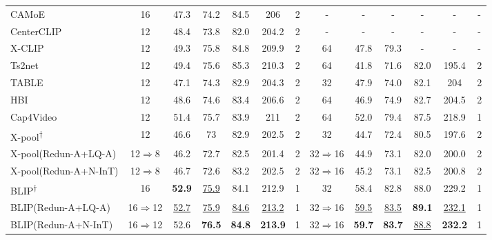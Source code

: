 \documentclass[11pt]{article}
\begin{document}
\begin{table*}[htbp]
\begin{center}
{\begin{tabular}{l|cccccc|cccccc}
CAMoE \cite{cheng2021improving}    & 16  & 47.3  & 74.2  & 84.5  & 206    & 2    & -        & -     & -     & -     & -      & -   \\
CenterCLIP \cite{zhao2022centerclip}   & 12  & 48.4  & 73.8  & 82.0  & 204.2  & 2    & -        & -     & -     & -     & -      & -   \\
X-CLIP \cite{ma2022x}     & 12      & 49.3  & 75.8  & 84.8  & 209.9  & 2    & 64       & 47.8  & 79.3  & -     & -      & -   \\
Ts2net \cite{liu2022ts2}     & 12   & 49.4  & 75.6  & 85.3  & 210.3  & 2    & 64       & 41.8  & 71.6  & 82.0  & 195.4  & 2   \\
TABLE \cite{chen2023tagging}   & 12     & 47.1  & 74.3  & 82.9  & 204.3  & 2    & 32       & 47.9  & 74.0  & 82.1  & 204    & 2   \\
HBI \cite{jin2023video}     & 12               & 48.6  & 74.6  & 83.4  & 206.6  & 2    & 64       & 46.9  & 74.9  & 82.7  & 204.5  & 2   \\
Cap4Video \cite{wu2022cap4video}   & 12               & 51.4  & 75.7  & 83.9  & 211    & 2    & 64       & 52.0  & 79.4  & 87.5  & 218.9  & 1   \\
\midrule
X-pool\textsuperscript{$\dagger$} \cite{gorti2022x}  & 12  & 46.6 & 73   & 82.9 & 202.5 & 2   & 32   & 44.7    & 72.4     & 80.5  & 197.6 & 2    \\
X-pool(Redun-A+LQ-A)    & 12$\Rightarrow$8   & 46.2  &  72.7  &  82.5  &  201.4  &  2   & 32$\Rightarrow$16  &  44.9 &  73.1  & 82.0 &  200.0  &  2   \\
X-pool(Redun-A+N-InT)    & 12$\Rightarrow$8   & 46.7  &  72.6  &  83.2  &  202.5  &  2   & 32$\Rightarrow$16  &  45.2 &  73.1  & 82.5 &  200.8 &  2   \\
\midrule
BLIP\textsuperscript{$\dagger$} \cite{li2022blip}      & 16  & \textbf{52.9} & \underline{75.9} & 84.1 & 212.9 & 1   & 32   & 58.4 & 82.8 & 88.0 & 229.2 & 1   \\
BLIP(Redun-A+LQ-A) & 16$\Rightarrow$12  & \underline{52.7} & \underline{75.9} & \underline{84.6} & \underline{213.2} & 1   & 32$\Rightarrow$16 & \underline{59.5} & \underline{83.5} & \textbf{89.1} & \underline{232.1}  & 1   \\
BLIP(Redun-A+N-InT) & 16$\Rightarrow$12  & 52.6 & \textbf{76.5} & \textbf{84.8} & \textbf{213.9} & 1 & 32$\Rightarrow$16 & \textbf{59.7} & \textbf{83.7} & \underline{88.8} & \textbf{232.2}  & 1   \\
\bottomrule[1pt]
\end{tabular}}
\end{center}
\vspace{-0.3cm}
\end{table*}
\end{document}
